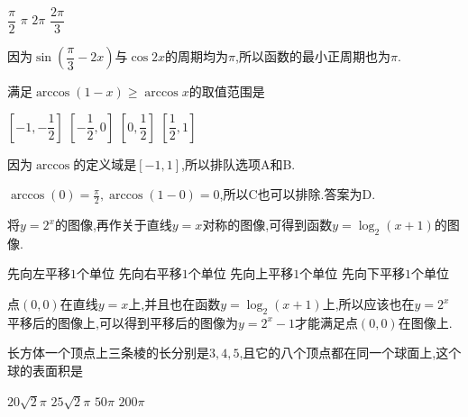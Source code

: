 \documentclass[answers]{exam}
\begin{document}
\begin{questions}
	\begin{oneparchoices}
		\choice $\dfrac{\pi}{2}$
		\CorrectChoice $\pi$
		\choice $2\pi$
		\choice $\dfrac{2\pi}{3}$
	\end{oneparchoices}

	\begin{solution}
		因为$\sin \left( \dfrac{\pi}{3} -2x \right)$与$\cos2x$的周期均为$\pi$,所以函数的最小正周期也为$\pi$.
	\end{solution}

	\question 满足$\arccos(1-x) \geqslant \arccos{x}$的取值范围是 \hfs

	\begin{oneparchoices}
		\choice $\left[-1, -\dfrac12\right]$
		\choice $\left[-\dfrac12, 0\right]$
		\choice $\left[0, \dfrac12\right]$
		\CorrectChoice $\left[\dfrac12, 1\right]$
	\end{oneparchoices}

	\begin{solution}
		因为$\arccos$的定义域是$[-1,1]$,所以排队选项A和B.

		$\arccos(0) = \frac{\pi}{2}, \arccos(1-0)=0$,所以C也可以排除.答案为D.
	\end{solution}

	\question 将$y=2^x$的图像\underline{\hspace{.5cm}},再作关于直线$y=x$对称的图像,可得到函数$y=\log_2(x+1)$的图像. \hfs

	\begin{oneparchoices}
		\choice 先向左平移$1$个单位
		\choice 先向右平移$1$个单位
		\choice 先向上平移$1$个单位
		\CorrectChoice 先向下平移$1$个单位
	\end{oneparchoices}

	\begin{solution}
		点$(0,0)$在直线$y=x$上,并且也在函数$y=\log_2(x+1)$上,所以应该也在$y=2^x$平移后的图像上,可以得到平移后的图像为$y=2^x
			- 1$才能满足点$(0,0)$在图像上.
	\end{solution}

	\question 长方体一个顶点上三条棱的长分别是$3,4,5$,且它的八个顶点都在同一个球面上,这个球的表面积是

	\hfs

	\begin{oneparchoices}
		\choice $20\sqrt{2}\pi$
		\choice $25\sqrt{2}\pi$
		\choice $50\pi$
		\choice $200\pi$
	\end{oneparchoices}

	\begin{solution}


\end{solution}
\end{questions}
\end{document}
